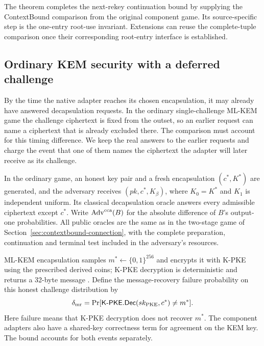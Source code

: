 \documentclass[pdflatex]{sn-jnl}
\theoremstyle{thmstyleone}
\theoremstyle{thmstylethree}
\theoremstyle{thmstyletwo}
\begin{document}
The theorem completes the next-rekey continuation bound by supplying the
ContextBound comparison from the original component game. Its
source-specific step is the one-entry root-use invariant. Extensions can
reuse the complete-tuple comparison once their corresponding root-entry
interface is established.
\subsection{Ordinary KEM security with a deferred challenge}
\label{sec:kem-ordinary-bridge}

By the time the native adapter reaches its chosen encapsulation, it
may already have answered decapsulation requests. In the ordinary
single-challenge ML-KEM game the challenge ciphertext is fixed from
the outset, so an earlier request can name a ciphertext that is already
excluded there. The comparison must account for this timing difference.
We keep the real answers to the earlier requests and charge the event
that one of them names the ciphertext the adapter will later receive
as its challenge.

In the ordinary game, an honest key pair and a fresh encapsulation
$(c^*,K^*)$ are generated, and the adversary receives
$(pk,c^*,K_\beta)$, where $K_0=K^*$ and $K_1$ is independent uniform.
Its classical decapsulation oracle answers every admissible ciphertext
except $c^*$. Write $\operatorname{Adv}^{\rm cca}(B)$ for the absolute
difference of $B$'s output-one probabilities. All public oracles are the
same as in the two-stage game of
Section~\ref{sec:contextbound-connection}, with the complete preparation,
continuation and terminal test included in the adversary's resources.

ML-KEM encapsulation samples $m^*\gets\{0,1\}^{256}$ and encrypts it
with K-PKE using the prescribed derived coins; K-PKE decryption is
deterministic and returns a 32-byte message
\cite[Algorithms 14--17 and 20]{fips203}. Define the message-recovery
failure probability on this honest challenge distribution by
\[
 \delta_{\rm mr}
 =\Pr[\mathsf{K\mbox{-}PKE.Dec}(sk_{\rm PKE},c^*)\ne m^*].
\]
Here failure means that K-PKE decryption does not recover $m^*$.
The component adapters also have a shared-key correctness term for
agreement on the KEM key. The bound accounts for both events separately.
\end{document}
